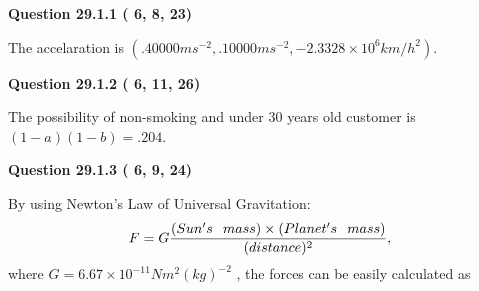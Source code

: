 \documentclass[12pt]{article}
\begin{document}
\vspace{0.2in}
  
{\textbf{\Large{Question
29.1.1 
 (          6,          8,         23)
}}}
  
  
 
 
\noindent{}
 
 
The accelaration is
$(
.40000ms^{-2},
.10000ms^{-2},
-2.3328 \times 10^{6}km/h^2
).
$
 
 
 
 
  
\vspace{0.2in}
  
{\textbf{\Large{Question
29.1.2 
 (          6,         11,         26)
}}}
  
  
 
 
\noindent{}

The possibility of  %
 non-smoking and  %
under 30 years old
customer is $ (1-a)(1-b) =  %
.204 $.
 
 
  
\vspace{0.2in}
  
{\textbf{\Large{Question
29.1.3 
 (          6,          9,         24)
}}}
  
  
 
 
\noindent{}

By using Newton's Law of Universal Gravitation:
\[
F=G \frac{(Sun's \hspace{0.1in} mass) \times (Planet's \hspace{0.1in} mass)} { (distance)^2},
\]
where
$ G= %
6.67 \times 10^{-11} N m^{2}(kg)^{-2}$ , the forces can be easily calculated as
 
\vspace{0.2in}
 
\end{document}
